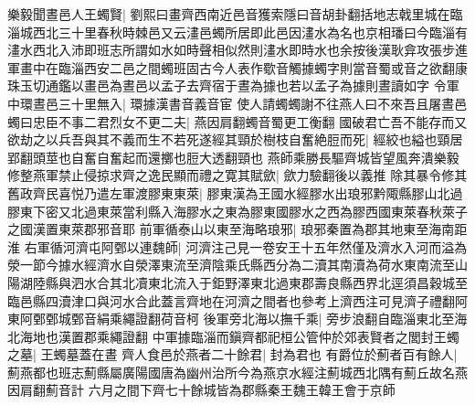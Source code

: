 樂毅聞晝邑人王蠋賢|{
	劉熙曰畫齊西南近邑音獲索隱曰音胡卦翻括地志戟里城在臨淄城西北三十里春秋時棘邑又云澅邑蠋所居即此邑因澅水為名也京相璠曰今臨淄有澅水西北入沛即班志所謂如水如時聲相似然則澅水即時水也余按後漢耿弇攻張步進軍畫中在臨淄西安二邑之間蠋班固古今人表作歜音觸據蠋字則當音蜀或音之欲翻康珠玉切通鑑以畫邑為晝邑以孟子去齊宿于晝為據也若以孟子為據則晝讀如字}
令軍中環晝邑三十里無入|{
	環據漢書音義音宦}
使人請蠋蠋謝不往燕人曰不來吾且屠晝邑蠋曰忠臣不事二君烈女不更二夫|{
	燕因肩翻蠋音蜀更工衡翻}
國破君亡吾不能存而又欲劫之以兵吾與其不義而生不若死遂經其頸於樹枝自奮絶脰而死|{
	經絞也縊也頸居郢翻頭莖也自奮自奮起而還擲也脰大透翻頸也}
燕師乘勝長驅齊城皆望風奔潰樂毅修整燕軍禁止侵掠求齊之逸民顯而禮之寛其賦歛|{
	歛力驗翻後以義推}
除其暴令修其舊政齊民喜悦乃遣左軍渡膠東東萊|{
	膠東漢為王國水經膠水出琅邪黔陬縣膠山北過膠東下密又北過東萊當利縣入海膠水之東為膠東國膠水之西為膠西國東萊春秋萊子之國漢置東萊郡邪音耶}
前軍循泰山以東至海略琅邪|{
	琅邪秦置為郡其地東至海南距淮}
右軍循河濟屯阿鄄以連魏師|{
	河濟注己見一卷安王十五年然僅及濟水入河而溢為滎一節今據水經濟水自滎澤東流至濟陰乘氏縣西分為二瀆其南瀆為荷水東南流至山陽湖陸縣與泗水合其北凟東北流入于鉅野澤東北過東郡壽良縣西界北逕須昌穀城至臨邑縣四瀆津口與河水合此蓋言齊地在河濟之間者也參考上濟西注可見濟子禮翻阿東阿鄄鄄城鄄音絹乘繩證翻荷音柯}
後軍旁北海以撫千乘|{
	旁步浪翻自臨淄東北至海北海地也漢置郡乘繩證翻}
中軍據臨淄而鎭齊都祀桓公管仲於郊表賢者之閭封王蠋之墓|{
	王蠋墓蓋在晝}
齊人食邑於燕者二十餘君|{
	封為君也}
有爵位於薊者百有餘人|{
	薊燕都也班志薊縣屬廣陽國唐為幽州治所今為燕京水經注薊城西北隅有薊丘故名燕因肩翻薊音計}
六月之間下齊七十餘城皆為郡縣秦王魏王韓王會于京師


